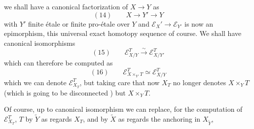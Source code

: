 

we shall have a canonical factorization of
$X\longrightarrow Y$ as
\[
(14)\qquad X\longrightarrow Y'\longrightarrow Y
\]
with $Y'$ finite étale or finite pro-étale over $Y$
and $\mathcal E_X'\longrightarrow\mathcal E_{Y'}$ is now an epimorphism,
 this universal exact homotopy sequence
of course. We shall have canonical isomorphisms
\[
(15)\qquad \mathcal E_{X/Y}^T\xrightarrow{\sim}\mathcal E_{X/Y'}^T
\]
which can therefore be computed as
\[
(16)\qquad \mathcal E_{X\times_{Y'}T}^T\simeq\mathcal E_{X/Y}^T
\]
which we can denote $\mathcal E_{X_T}^T$, but
taking care that now
$X_T$ no longer denotes $X\times_YT$ (which
is going to be disconnected ) but $X\times_YT$.

Of course, up to canonical isomorphism we can
 replace, for the computation of $\mathcal E_{X_T}^T$,
$T$ by $\widetilde Y$ as regards $X_T$, and by
$\widetilde X$ as regards the anchoring in $X_{\widetilde Y}$,

